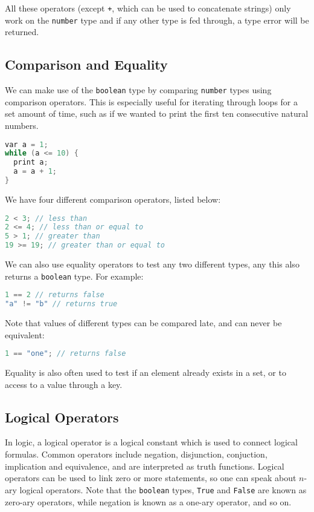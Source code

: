 All these operators (except \verb-+-, which can be used to concatenate strings) only work on the \verb+number+ type and if any other type is fed through, a type error will be returned.

\subsection{Comparison and Equality}

We can make use of the \verb+boolean+ type by comparing \verb+number+ types using comparison operators. This is especially useful for iterating through loops for a set amount of time, such as if we wanted to print the first ten consecutive natural numbers. 

\begin{lstlisting}[language=C]
var a = 1;
while (a <= 10) {
  print a;
  a = a + 1;
}
\end{lstlisting}

We have four different comparison operators, listed below: 

\begin{lstlisting}[language=C]
2 < 3; // less than
2 <= 4; // less than or equal to
5 > 1; // greater than
19 >= 19; // greater than or equal to 
\end{lstlisting}

We can also use equality operators to test any two different types, any this also returns a \verb+boolean+ type. For example:

\begin{lstlisting}[language=C]
1 == 2 // returns false
"a" != "b" // returns true
\end{lstlisting}

Note that values of different types can be compared late, and can never be equivalent: 

\begin{lstlisting}[language=C]
1 == "one"; // returns false
\end{lstlisting}

Equality is also often used to test if an element already exists in a set, or to access to a value through a key.

\subsection{Logical Operators}

In logic, a logical operator is a logical constant which is used to connect logical formulas. Common operators include negation, disjunction, conjuction, implication and equivalence, and are interpreted as truth functions. Logical operators can be used to link zero or more statements, so one can speak about \(n\)-ary logical operators. Note that the \verb+boolean+ types, \verb+True+ and \verb+False+ are known as zero-ary operators, while negation is known as a one-ary operator, and so on. 

